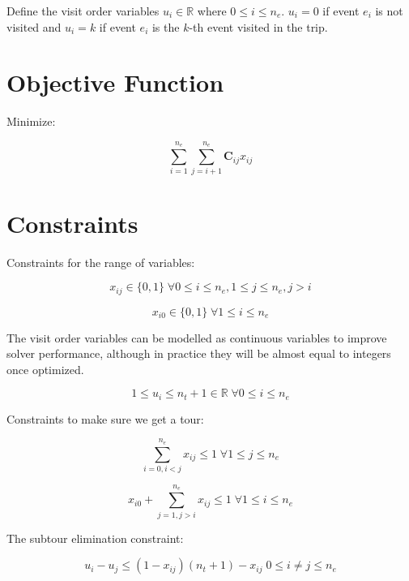 \documentclass[11pt]{article}
\begin{document}
Define the visit order variables $u_i \in \mathbb{R}$ where $0 \leq i \leq n_e$. $u_i = 0$ if event $e_i$ is not visited and $u_i = k$ if event $e_i$ is the $k$-th event visited in the trip.

\section{Objective Function}
Minimize:

\begin{equation} \label{eq:objective}
\sum_{i=1}^{n_e} \sum_{j=i+1}^{n_e} \mathbf{C}_{ij} x_{ij}
\end{equation}

\section{Constraints}
Constraints for the range of variables:

\begin{equation} \label{constr:x}
    x_{ij} \in \{0, 1\} \; \forall 0 \leq i \leq n_e, 1 \leq j \leq n_e, j > i
\end{equation}

\begin{equation} \label{constr:x_dummy}
    x_{i0} \in \{0, 1\} \; \forall 1 \leq i \leq n_e
\end{equation}

The visit order variables can be modelled as continuous variables to improve solver performance, although in practice they will be almost equal to integers once optimized.

\begin{equation} \label{constr:u}
    1 \leq u_i \leq n_t + 1 \in \mathbb{R} \; \forall 0 \leq i \leq n_e
\end{equation}

Constraints to make sure we get a tour:

\begin{equation} \label{constr:in_edge}
    \sum_{i=0, i < j}^{n_e} x_{ij} \leq 1 \; \forall 1 \leq j \leq n_e
\end{equation}

\begin{equation} \label{constr:out_edge}
    x_{i0} + \sum_{j=1, j > i}^{n_e} x_{ij} \leq 1 \; \forall 1 \leq i \leq n_e
\end{equation}

The subtour elimination constraint:

\begin{equation} \label{constr:order}
    u_i - u_j \leq (1 - x_{ij})(n_t + 1) - x_{ij} \; 0 \leq i \neq j \leq n_e
\end{equation}
\end{document}
